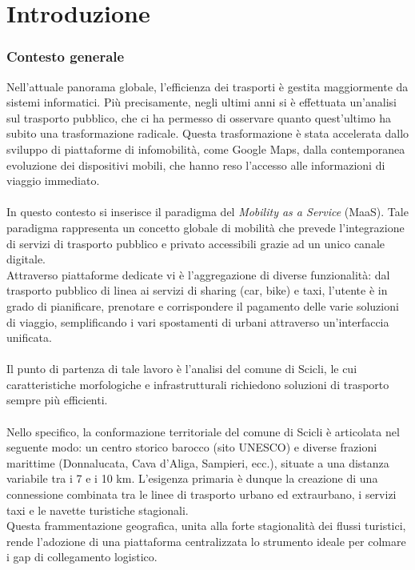 \chapter{Introduzione}
\subsection*{Contesto generale }
Nell’attuale panorama globale, l’efficienza dei trasporti è gestita maggiormente da sistemi informatici. Più precisamente, negli ultimi anni si è effettuata un’analisi sul trasporto pubblico, che ci ha permesso di osservare quanto quest’ultimo ha subito una trasformazione radicale. Questa trasformazione è stata accelerata dallo sviluppo di piattaforme di infomobilità, come Google Maps, dalla contemporanea evoluzione dei dispositivi mobili, che hanno reso l’accesso alle informazioni di viaggio immediato.
\\ \\
In questo contesto si inserisce il paradigma del \textit{Mobility as a Service} (MaaS). Tale paradigma rappresenta un concetto globale di mobilità che prevede l’integrazione di servizi di trasporto pubblico e privato accessibili grazie ad un unico canale digitale. \\
Attraverso piattaforme dedicate vi è l'aggregazione di diverse funzionalità: dal trasporto pubblico di linea ai servizi di sharing (car, bike) e taxi, l’utente è in grado di pianificare, prenotare e corrispondere il pagamento delle varie soluzioni di viaggio, semplificando i vari spostamenti di urbani attraverso un’interfaccia unificata.
\\ \\
Il punto di partenza di tale lavoro è l'analisi del comune di Scicli, le cui caratteristiche morfologiche e infrastrutturali richiedono soluzioni di trasporto sempre più efficienti. 
\\ \\
Nello specifico, la conformazione territoriale del comune di Scicli è articolata nel seguente modo: un centro storico barocco (sito UNESCO) e diverse frazioni marittime (Donnalucata, Cava d’Aliga, Sampieri, ecc.), situate a una distanza variabile tra i 7 e i 10 km. L’esigenza primaria è dunque la creazione di una connessione combinata tra le linee di trasporto urbano ed extraurbano, i servizi taxi e le navette turistiche stagionali. \\
Questa frammentazione geografica, unita alla forte stagionalità dei flussi turistici, rende l'adozione di una piattaforma centralizzata lo strumento ideale per colmare i gap di collegamento logistico.

